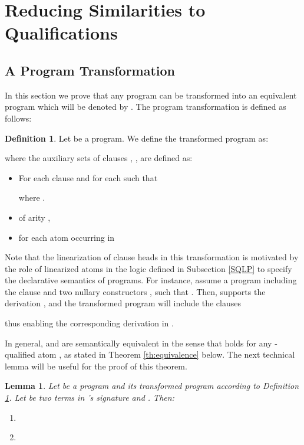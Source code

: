 \documentclass{sigplanconf}
\theoremstyle{definition}
\newtheorem{definition}{Definition}
\theoremstyle{plain}
\newtheorem{lemma}{Lemma}
\begin{document}
\section{Reducing Similarities to Qualifications} \label{Reduction}

\subsection{A Program Transformation} \label{sec:PT}

In this section we prove that any  program  can be transformed into an equivalent  program which will be denoted by . The program transformation is defined as follows:

\begin{definition} \label{def:trans}
Let  be a  program. We define the transformed program  as:

where the auxiliary sets of clauses , ,  are defined as:
\begin{itemize}
\item For each clause  and for each  such that 

where .
\item  
       of arity , 
\item  for each atom  occurring in 
\end{itemize}
\end{definition}

Note that the linearization of clause heads in this transformation is motivated by the role of linearized atoms in the  logic defined in Subsection \ref{SQLP} to specify the declarative semantics of  programs. For instance, assume  a  program  including the clause  and two nullary constructors ,  such that . Then,  supports the derivation , and the transformed program  will include the clauses

thus enabling the corresponding derivation  in .



In general,  and  are semantically equivalent in the sense that   holds for any -qualified atom , as stated in Theorem \ref{th:equivalence} below. The next technical lemma will be useful for the proof of this theorem.

\begin{lemma} \label{lema:equiv}
Let  be a  program and  its transformed program according to Definition \ref{def:trans}. Let  be two terms in 's signature and . Then:
\begin{enumerate}
    \item \label{lema:equiv:1} 
    \item \label{lema:equiv:2} 
\end{enumerate}
\end{lemma}
\end{document}
